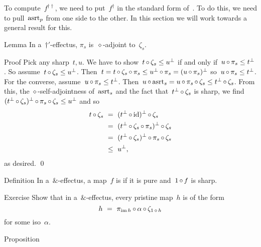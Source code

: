 \documentclass[b]{subfiles}
\begin{document}
\begin{parsec}%
\begin{point}%
To compute~$f^{\dagger\dagger}$,
    we need to put~$f^\dagger$
    in the standard form of~.
To do this, we need to pull~$\mathrm{asrt}_p$ from one side to the other.
In this section we will work towards a general result for this.
\end{point}
\begin{point}{Lemma}%
In a~$\dagger'$-effectus,
$\pi_s$ is~$\diamond$-adjoint to~$\zeta_s$.
\begin{point}{Proof}%
    Pick any sharp~$t,u$.
We have to
    show~$t \mathop{\circ} \zeta_s \leq u^\perp$
    if and only if~$u \mathop{\circ} \pi_s \leq t^\perp$.
So assume~$t \mathop{\circ} \zeta_s \leq u^\perp$.
Then~$t =  t\mathop{\circ} \zeta_s \mathop{\circ} \pi_s  \leq  u^\perp \mathop{\circ} \pi_s
                 =  (u \mathop{\circ} \pi_s)^\perp$
    so~$u \mathop{\circ} \pi_s \leq t^\perp$.
For the converse, assume~$u \mathop{\circ} \pi_s \leq t^\perp$.
Then~$u \mathop{\circ} \mathrm{asrt}_s = u \mathop{\circ} \pi_s \mathop{\circ} \zeta_s \leq t^\perp \mathop{\circ} \zeta_s$.
From this,
    the
    $\diamond$-self-adjointness of~$\mathrm{asrt}_s$
    and the fact that~$t^\perp \mathop{\circ} \zeta_s$ is sharp,
    we find~$(t^\perp \mathop{\circ} \zeta_s)^\perp \mathop{\circ} \pi_s \mathop{\circ} \zeta_s \leq
        u^\perp$
    and so
\begin{alignat*}{2}
    t \mathop{\circ} \zeta_s
    &\ =\  (t^\perp \mathop{\circ} \operatorname{id})^\perp \mathop{\circ} \zeta_s \\
    &\ =\  (t^\perp \mathop{\circ} \zeta_s \mathop{\circ} \pi_s)^\perp \mathop{\circ} \zeta_s \\
    &\ =\  (t^\perp \mathop{\circ} \zeta_s)^\perp \mathop{\circ} \pi_s \mathop{\circ} \zeta_s \\
    &\ \leq \ u^\perp,
\end{alignat*}
as desired. \qed
\end{point}
\end{point}
\begin{point}{Definition}%
In a~$\&$-effectus, a map~$f$ is 
        if it is pure and~$1\mathop{\circ} f$ is sharp.
\end{point}
\begin{point}{Exercise}%
Show that in a~$\&$-effectus, every pristine map~$h$ is of the form
        \begin{equation*}
            h \ =\ \pi_{\operatorname{im} h} \mathop{\circ} \alpha \mathop{\circ} \zeta_{1 \mathop{\circ} h}
        \end{equation*}
        for some iso~$\alpha$.
\end{point}
\begin{point}{Proposition}%

\end{point}
\end{parsec}
\end{document}
